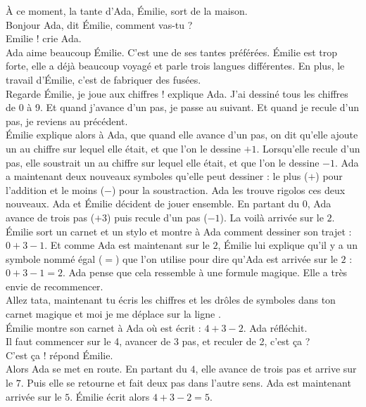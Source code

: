 À ce moment, la tante d'Ada, Émilie, sort de la maison. \\
\guillemotleft Bonjour Ada, dit Émilie, comment vas-tu ?\\
\mdash Emilie !  crie Ada. \guillemotright \\
Ada aime beaucoup Émilie. C’est une de ses tantes préférées. Émilie est trop forte, elle a déjà beaucoup voyagé et parle trois langues différentes. En plus, le travail d’Émilie, c’est de fabriquer des fusées.\\
\guillemotleft Regarde Émilie, je joue aux chiffres ! explique Ada. J’ai dessiné tous les chiffres de 0 à 9. Et quand j’avance d’un pas, je passe au suivant. Et quand je recule d’un pas, je reviens au précédent. \guillemotright \\
Émilie explique alors à Ada, que quand elle avance d’un pas, on dit qu’elle ajoute un au chiffre sur lequel elle était, et que l’on le dessine $+1$. Lorsqu’elle recule d’un pas, elle soustrait un au chiffre sur lequel elle était, et que l’on le dessine $-1$. Ada a maintenant deux nouveaux symboles qu’elle peut dessiner : le plus ($+$) pour l’addition et le moins ($-$) pour la soustraction. Ada les trouve rigolos ces deux nouveaux. 
Ada et Émilie décident de jouer ensemble. En partant du $0$, Ada avance de trois pas ($+3$) puis recule d'un pas ($-1$). La voilà arrivée sur le $2$. Émilie sort un carnet et un stylo et montre à Ada comment dessiner son trajet : $0 + 3 - 1 $. Et comme Ada est maintenant sur le $2$, Émilie lui explique qu’il y a un symbole nommé égal ($=$) que l’on utilise pour dire qu’Ada est arrivée sur le $2$ : $0 + 3 - 1 = 2$. Ada pense que cela ressemble à une formule magique. Elle a très envie de recommencer. \\
\guillemotleft Allez tata, maintenant tu écris les chiffres et les drôles de symboles dans ton carnet magique et moi je me déplace sur la ligne \guillemotright. \\
Émilie montre son carnet à Ada où est écrit : $4 + 3 - 2$. Ada réfléchit. \\
\guillemotleft Il faut commencer sur le 4, avancer de 3 pas, et reculer de 2, c’est ça ? \\
\mdash C’est ça ! répond Émilie. \guillemotright \\
Alors Ada se met en route. En partant du $4$, elle avance de trois pas et arrive sur le $7$. Puis elle se retourne et fait deux pas dans l’autre sens. Ada est maintenant arrivée sur le $5$. Émilie écrit alors $4 + 3 - 2 = 5 $.\\
